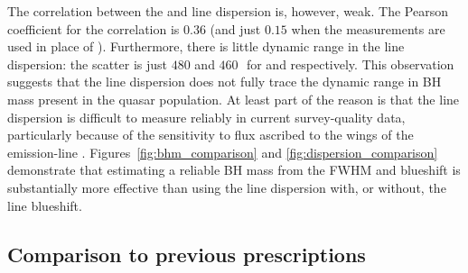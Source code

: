 The correlation between the \ha and  line dispersion is, however, weak. 
The Pearson coefficient for the correlation is $0.36$ (and just $0.15$ when the \hb measurements are used in place of \hans). 
Furthermore, there is little dynamic range in the line dispersion: the scatter is just $480$ and $460$\,\kms\, for \ha and  respectively. 
This observation suggests that the line dispersion does not fully trace the dynamic range in BH mass present in the quasar population. 
At least part of the reason is that the line dispersion is difficult to measure reliably in current survey-quality data, particularly because of the sensitivity to flux ascribed to the wings of the emission-line \citep[e.g.][]{mejia-restrepo16}.
Figures~\ref{fig:bhm_comparison} and \ref{fig:dispersion_comparison} demonstrate that estimating a reliable BH mass from the  FWHM and blueshift is substantially more effective than using the  line dispersion with, or without, the line blueshift. 

\subsection{Comparison to previous prescriptions}

